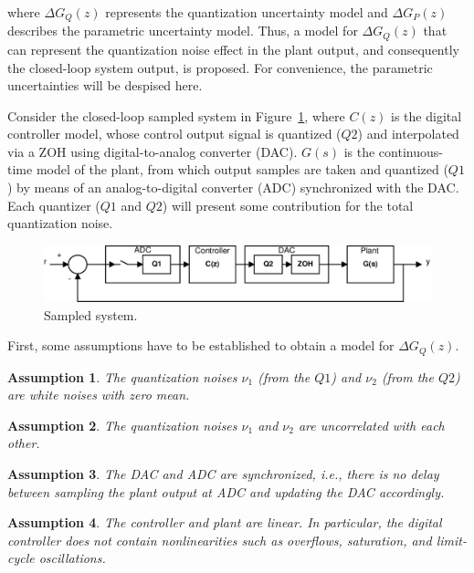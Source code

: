 \documentclass{sig-alternate-05-2015}
\newtheorem{myassumption}{Assumption}
\begin{document}
\noindent where $\Delta{G_{Q}(z)}$ represents the quantization uncertainty
model and $\Delta{G_{P}(z)}$ describes the parametric uncertainty model. 
Thus, a model for $\Delta{G_{Q}(z)}$ that can represent the quantization
noise effect in the plant output, and consequently the closed-loop system
output, is proposed.  For convenience, the parametric uncertainties will be
despised here.

Consider the closed-loop sampled system in Figure~\ref{fig:sampledsystem},
where $C(z)$ is the digital controller model, whose control output signal is
quantized ($Q2$) and interpolated via a ZOH using digital-to-analog
converter (DAC).  $G(s)$ is the continuous-time model of the plant, from
which output samples are taken and quantized ($Q1$) by means of an
analog-to-digital converter (ADC) synchronized with the DAC.  Each quantizer
($Q1$ and $Q2$) will present some contribution for the total quantization
noise.
%
\begin{figure}[ht]
\centering
\includegraphics[width=\columnwidth]{figures/hsystembd.pdf}
\caption{Sampled system.}
\label{fig:sampledsystem}
\end{figure}

First, some assumptions have to be established to obtain a model for
$\Delta{G_{Q}(z)}$.
%
\begin{myassumption}
\label{whitenoise}
%
The quantization noises $\nu_{1}$ (from the $Q1$) and $\nu_{2}$ (from the
$Q2$) are white noises with zero mean.
%
\end{myassumption}

\begin{myassumption}
The quantization noises $\nu_{1}$ and $\nu_{2}$ are uncorrelated with each other.
\end{myassumption}

\begin{myassumption}
%
The DAC and ADC are synchronized, {\it i.e.}, there is no delay between
sampling the plant output at ADC and updating the DAC accordingly.
%
\end{myassumption}

\begin{myassumption}
%
The controller and plant are linear.  In particular, the digital controller
does not contain nonlinearities such as overflows, saturation, and
limit-cycle oscillations.
%
\end{myassumption}
\end{document}
